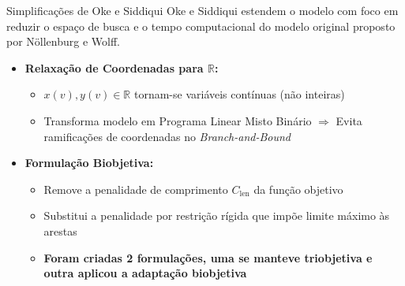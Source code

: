 \documentclass{beamer}
\begin{document}
\begin{frame}{Simplificações de Oke e Siddiqui}
  Oke e Siddiqui estendem o modelo com foco em reduzir o espaço de busca e o tempo computacional do modelo original proposto por Nöllenburg e Wolff.

  \vspace{0.2cm}
  \begin{itemize}
    \item \textbf{Relaxação de Coordenadas para $\mathbb{R}$:}
      \begin{itemize}
        \item $x(v), y(v) \in \mathbb{R}$ tornam-se variáveis contínuas (não inteiras)
        \item Transforma modelo em Programa Linear Misto Binário $\Rightarrow$ Evita ramificações de coordenadas no \textit{Branch-and-Bound}
      \end{itemize}

    \item \textbf{Formulação Biobjetiva:}
      \begin{itemize}
        \item Remove a penalidade de comprimento $C_{\text{len}}$ da função objetivo
        \item Substitui a penalidade por restrição rígida que impõe limite máximo às arestas
        \item \textbf{Foram criadas 2 formulações, uma se manteve triobjetiva e outra aplicou a adaptação biobjetiva}
      \end{itemize}
  \end{itemize}
\end{frame}



\end{document}
